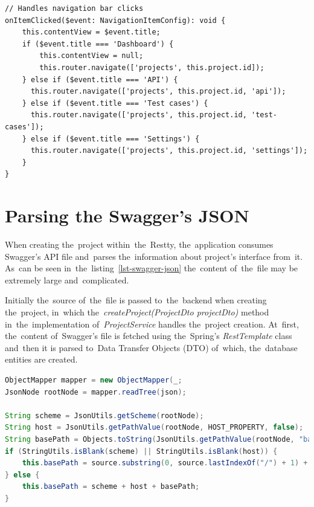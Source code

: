 \begin{lstlisting}[caption=Solution of~routing the~subpages in~the~\textit{ProjectDetailComponent}.,
style=dp-default]
// Handles navigation bar clicks
onItemClicked($event: NavigationItemConfig): void {
	this.contentView = $event.title;
	if ($event.title === 'Dashboard') {
		this.contentView = null;
		this.router.navigate(['projects', this.project.id]);
    } else if ($event.title === 'API') {
      this.router.navigate(['projects', this.project.id, 'api']);
    } else if ($event.title === 'Test cases') {
      this.router.navigate(['projects', this.project.id, 'test-cases']);
    } else if ($event.title === 'Settings') {
      this.router.navigate(['projects', this.project.id, 'settings']);
    }
}
\end{lstlisting}

\section{Parsing the Swagger's JSON}
When creating the~project within~the~Restty, the~application consumes Swagger's API file and~parses the~information
about project's interface from~it. As~can be seen in~the~listing~\ref{lst-swagger-json} the~content of~the~file may be extremely
large and~complicated. 

Initially the~source of~the~file is passed to~the~backend when creating the~project, in~which the~\textit{createProject(ProjectDto projectDto)}
method in~the~implementation of~\textit{ProjectService} handles the~project creation. At~first, the~content of~Swagger's file is fetched
using the~Spring's \textit{RestTemplate} class and~then it is parsed to~Data Transfer Objects (DTO) of~which, the~database entities are created.

\vspace{1mm}
\begin{lstlisting}[caption=Parsing the~address of~the~test server from~Swagger's API file,
style=dp-default, language=Java]
ObjectMapper mapper = new ObjectMapper(_;
JsonNode rootNode = mapper.readTree(json);

String scheme = JsonUtils.getScheme(rootNode);
String host = JsonUtils.getPathValue(rootNode, HOST_PROPERTY, false);
String basePath = Objects.toString(JsonUtils.getPathValue(rootNode, "basePath", false), "");
if (StringUtils.isBlank(scheme) || StringUtils.isBlank(host)) {
	this.basePath = source.substring(0, source.lastIndexOf("/") + 1) + basePath;
} else {
	this.basePath = scheme + host + basePath;
}
\end{lstlisting}

